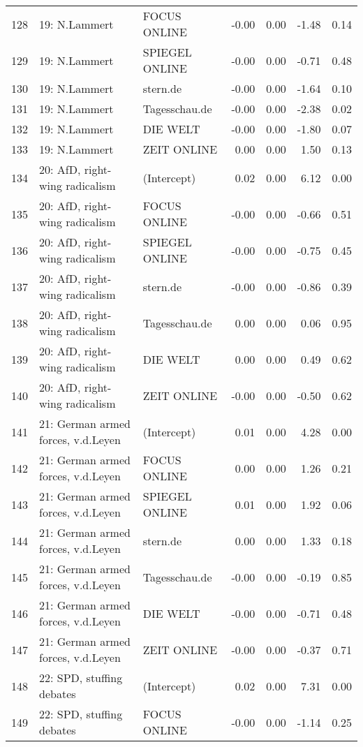 \begin{table}[ht]
{\begin{tabular}{rllrrrr}
  128 & 19: N.Lammert & FOCUS ONLINE & -0.00 & 0.00 & -1.48 & 0.14 \\ 
  129 & 19: N.Lammert & SPIEGEL ONLINE & -0.00 & 0.00 & -0.71 & 0.48 \\ 
  130 & 19: N.Lammert & stern.de & -0.00 & 0.00 & -1.64 & 0.10 \\ 
  131 & 19: N.Lammert & Tagesschau.de & -0.00 & 0.00 & -2.38 & 0.02 \\ 
  132 & 19: N.Lammert & DIE WELT & -0.00 & 0.00 & -1.80 & 0.07 \\ 
  133 & 19: N.Lammert & ZEIT ONLINE & 0.00 & 0.00 & 1.50 & 0.13 \\ 
  134 & 20: AfD, right-wing radicalism & (Intercept) & 0.02 & 0.00 & 6.12 & 0.00 \\ 
  135 & 20: AfD, right-wing radicalism & FOCUS ONLINE & -0.00 & 0.00 & -0.66 & 0.51 \\ 
  136 & 20: AfD, right-wing radicalism & SPIEGEL ONLINE & -0.00 & 0.00 & -0.75 & 0.45 \\ 
  137 & 20: AfD, right-wing radicalism & stern.de & -0.00 & 0.00 & -0.86 & 0.39 \\ 
  138 & 20: AfD, right-wing radicalism & Tagesschau.de & 0.00 & 0.00 & 0.06 & 0.95 \\ 
  139 & 20: AfD, right-wing radicalism & DIE WELT & 0.00 & 0.00 & 0.49 & 0.62 \\ 
  140 & 20: AfD, right-wing radicalism & ZEIT ONLINE & -0.00 & 0.00 & -0.50 & 0.62 \\ 
  141 & 21: German armed forces, v.d.Leyen & (Intercept) & 0.01 & 0.00 & 4.28 & 0.00 \\ 
  142 & 21: German armed forces, v.d.Leyen & FOCUS ONLINE & 0.00 & 0.00 & 1.26 & 0.21 \\ 
  143 & 21: German armed forces, v.d.Leyen & SPIEGEL ONLINE & 0.01 & 0.00 & 1.92 & 0.06 \\ 
  144 & 21: German armed forces, v.d.Leyen & stern.de & 0.00 & 0.00 & 1.33 & 0.18 \\ 
  145 & 21: German armed forces, v.d.Leyen & Tagesschau.de & -0.00 & 0.00 & -0.19 & 0.85 \\ 
  146 & 21: German armed forces, v.d.Leyen & DIE WELT & -0.00 & 0.00 & -0.71 & 0.48 \\ 
  147 & 21: German armed forces, v.d.Leyen & ZEIT ONLINE & -0.00 & 0.00 & -0.37 & 0.71 \\ 
  148 & 22: SPD, stuffing debates & (Intercept) & 0.02 & 0.00 & 7.31 & 0.00 \\ 
  149 & 22: SPD, stuffing debates & FOCUS ONLINE & -0.00 & 0.00 & -1.14 & 0.25 \\ 

\end{tabular}}
\end{table}
